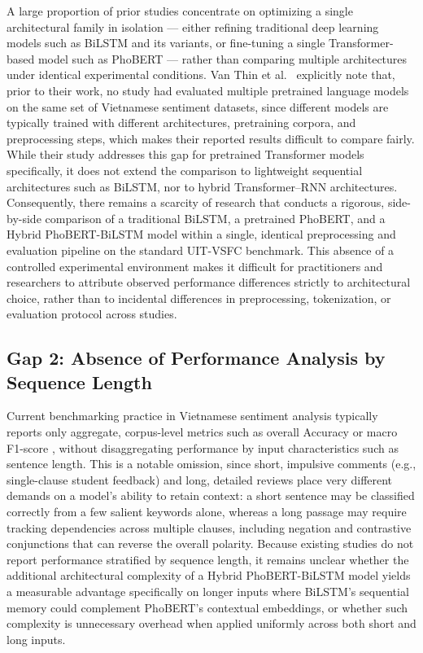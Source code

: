 \documentclass[12pt]{report} %
\begin{document}
A large proportion of prior studies concentrate on optimizing a single architectural family in isolation --- either refining traditional deep learning models such as BiLSTM and its variants, or fine-tuning a single Transformer-based model such as PhoBERT --- rather than comparing multiple architectures under identical experimental conditions. Van Thin et al.\ \cite{thin2023vietnamese} explicitly note that, prior to their work, no study had evaluated multiple pretrained language models on the same set of Vietnamese sentiment datasets, since different models are typically trained with different architectures, pretraining corpora, and preprocessing steps, which makes their reported results difficult to compare fairly. While their study addresses this gap for pretrained Transformer models specifically, it does not extend the comparison to lightweight sequential architectures such as BiLSTM, nor to hybrid Transformer--RNN architectures. Consequently, there remains a scarcity of research that conducts a rigorous, side-by-side comparison of a traditional BiLSTM, a pretrained PhoBERT, and a Hybrid PhoBERT-BiLSTM model within a single, identical preprocessing and evaluation pipeline on the standard UIT-VSFC benchmark. This absence of a controlled experimental environment makes it difficult for practitioners and researchers to attribute observed performance differences strictly to architectural choice, rather than to incidental differences in preprocessing, tokenization, or evaluation protocol across studies.

\subsection*{Gap 2: Absence of Performance Analysis by Sequence Length}

Current benchmarking practice in Vietnamese sentiment analysis typically reports only aggregate, corpus-level metrics such as overall Accuracy or macro F1-score \cite{ieee2023challenges}, without disaggregating performance by input characteristics such as sentence length. This is a notable omission, since short, impulsive comments (e.g., single-clause student feedback) and long, detailed reviews place very different demands on a model's ability to retain context: a short sentence may be classified correctly from a few salient keywords alone, whereas a long passage may require tracking dependencies across multiple clauses, including negation and contrastive conjunctions that can reverse the overall polarity. Because existing studies do not report performance stratified by sequence length, it remains unclear whether the additional architectural complexity of a Hybrid PhoBERT-BiLSTM model yields a measurable advantage specifically on longer inputs where BiLSTM's sequential memory could complement PhoBERT's contextual embeddings, or whether such complexity is unnecessary overhead when applied uniformly across both short and long inputs.
\end{document}
